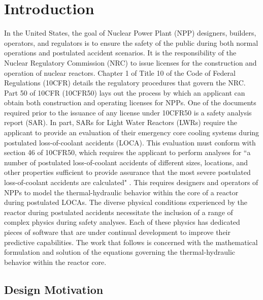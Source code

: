 \chapter{Introduction}
\label{chap:intro}
In the United States, the goal of Nuclear Power Plant (NPP) designers, builders, operators, and regulators is to ensure the safety of the public during both normal operations and postulated accident scenarios.
It is the responsibility of the Nuclear Regulatory Commission (NRC) to issue licenses for the construction and operation of nuclear reactors.
Chapter 1 of Title 10 of the Code of Federal Regulations (10CFR) details the regulatory procedures that govern the NRC.
Part 50 of 10CFR (10CFR50) lays out the process by which an applicant can obtain both construction and operating licenses for NPPs.
One of the documents required prior to the issuance of any license under 10CFR50 is a safety analysis report (SAR).
In part, SARs for Light Water Reactors (LWRs) require the applicant to provide an evaluation of their emergency core cooling systems during postulated loss-of-coolant accidents (LOCA).
This evaluation must conform with section 46 of 10CFR50, which requires the applicant to perform analyses for ``a number of postulated loss-of-coolant accidents of different sizes, locations, and other properties sufficient to provide assurance that the most severe postulated loss-of-coolant accidents are calculated" \cite{CFR10}.
This requires designers and operators of NPPs to model the thermal-hydraulic behavior within the core of a reactor during postulated LOCAs.  
The diverse physical conditions experienced by the reactor during postulated accidents necessitate the inclusion of a range of complex physics during safety analyses.
Each of these physics has dedicated pieces of software that are under continual development to improve their predictive capabilities.
The work that follows is concerned with the mathematical formulation and solution of the equations governing the thermal-hydraulic behavior within the reactor core.

\section{Design Motivation}
\label{sect:motivation}

